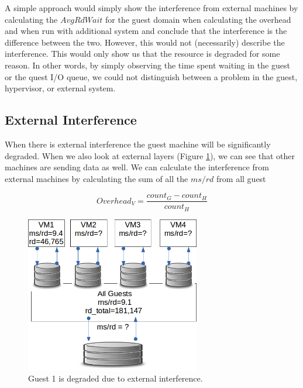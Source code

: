 A simple approach would simply show the interference from external machines by calculating the $AvgRdWait$ for the guest domain when calculating the overhead and when run with additional system and conclude that the interference is the difference between the two.  However, this would not (necessarily) describe the interference.  This would only show us that the resource is degraded for some reason.  In other words, by simply observing the time spent waiting in the guest or the quest I/O queue, we could not distinguish between a problem in the guest, hypervisor, or external system.

\subsection{External Interference}
When there is external interference the guest machine will be significantly degraded. 
When we also look at external layers (Figure \ref{int1}), we can see that other machines are sending data as well.  We can calculate the interference from external machines by calculating the sum of all the $ms/rd$ from all guest

\begin{equation}
  Overhead_V = \frac{count_G - count_H}{count_H} 
\end{equation}

\begin{figure}[h]
  \begin{center}
  \includegraphics[width=3in]{images/RPS_int1.png}
  \caption{Guest 1 is degraded due to external interference.}
  \label{int1}
  \end{center}
\end{figure}

